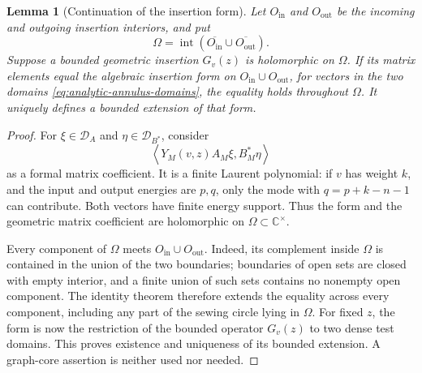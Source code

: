 \documentclass[11pt,a4paper]{article}
\newtheorem{lemma}[theorem]{Lemma}
\theoremstyle{definition}
\begin{document}
\begin{lemma}[Continuation of the insertion form]
\label{lem:analytic-insertion-continuation}
Let $O_{\mathrm{in}}$ and $O_{\mathrm{out}}$ be the incoming and
outgoing insertion interiors, and put
\[
 \Omega=\operatorname{int}
  (\overline{O_{\mathrm{in}}}\cup\overline{O_{\mathrm{out}}}).
\]
Suppose a bounded geometric insertion $G_v(z)$ is holomorphic on
$\Omega$.  If its matrix elements equal the algebraic insertion form
on $O_{\mathrm{in}}\cup O_{\mathrm{out}}$, for vectors in the two
domains \eqref{eq:analytic-annulus-domains}, the equality holds
throughout $\Omega$.  It uniquely defines a bounded extension of that
form.
\end{lemma}
\begin{proof}
For $\xi\in\mathcal D_A$ and $\eta\in\mathcal D_{B^*}$, consider
\begin{equation}
 \left\langle Y_M(v,z)A_M\xi,B_M^*\eta\right\rangle
 \label{eq:analytic-laurent-pairing}
\end{equation}
as a formal matrix coefficient.  It is a finite Laurent polynomial:
if $v$ has weight $k$, and the input and output energies are $p,q$,
only the mode with $q=p+k-n-1$ can contribute.  Both vectors have
finite energy support.  Thus the form and the geometric matrix
coefficient are holomorphic on $\Omega\subset\mathbb C^\times$.

Every component of $\Omega$ meets
$O_{\mathrm{in}}\cup O_{\mathrm{out}}$.  Indeed, its complement
inside $\Omega$ is contained in the union of the two boundaries;
boundaries of open sets are closed with empty interior, and a finite
union of such sets contains no nonempty open component.  The identity
theorem therefore extends the equality across every component,
including any part of the sewing circle lying in $\Omega$.
For fixed $z$, the form is now the restriction of the bounded operator
$G_v(z)$ to two dense test domains.  This proves existence and
uniqueness of its bounded extension.  A graph-core assertion is neither
used nor needed.
\end{proof}
\end{document}
